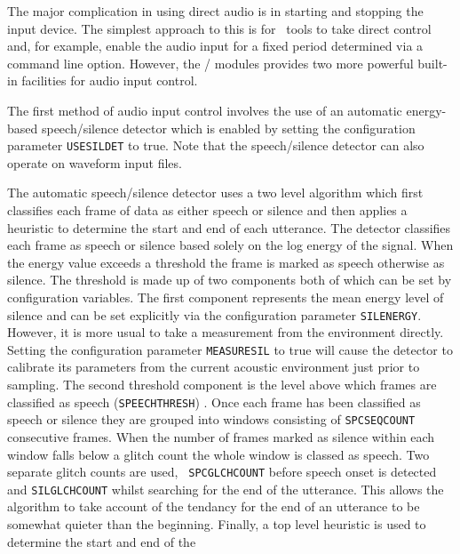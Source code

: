 The major complication in using direct audio is in starting and stopping the
input device.  The simplest approach to this is for \HTK\ tools to take direct
control and, for example, enable the audio input for a fixed period determined
via a command line option.  However, the / modules
provides two more powerful built-in facilities for audio input control.

The first method of audio input control involves the use of an automatic
energy-based speech/silence detector which is enabled by setting the
configuration parameter
\texttt{USESILDET} to true. Note that
the speech/silence detector can also operate on waveform input files.

The automatic speech/silence detector uses a two level algorithm which first
classifies each frame of data as either speech or silence and then applies a
heuristic to determine the start and end of each utterance. The detector classifies each
frame as speech or silence based solely on the log energy of the signal. When
the energy value exceeds a threshold the frame is marked as speech otherwise as
silence. The threshold is made up of two components both of which can be set by
configuration variables. The first component represents the mean energy level
of silence and can be set explicitly via the configuration
parameter \texttt{SILENERGY}. However, it is more usual to take a measurement
from the environment directly. Setting the configuration parameter
\texttt{MEASURESIL} to true will cause the detector to calibrate its parameters
from the current acoustic environment just prior to sampling. The second
threshold component is the level above which frames are classified as speech 
(\texttt{SPEECHTHRESH}) .
  
Once each frame has been classified as speech or silence they are grouped into
windows consisting of \texttt{SPCSEQCOUNT} consecutive frames.  When the number
of frames marked as silence within each window falls below a glitch count the
whole window is classed as speech.  Two separate glitch counts are used, {\tt
SPCGLCHCOUNT} before speech onset is detected and {\tt SILGLCHCOUNT} whilst
searching for the end of the utterance.  This allows the algorithm to take
account of the tendancy for the end of an utterance to be somewhat quieter than
the beginning.
  
Finally, a top level heuristic is used to determine the start and end of the
